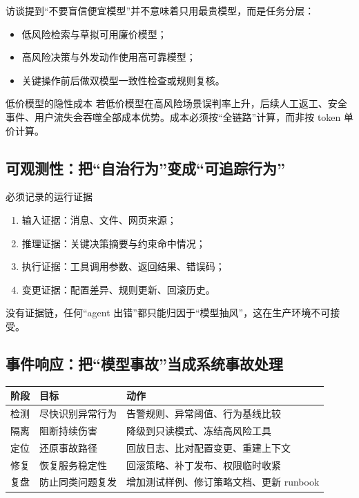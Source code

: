 \documentclass[a4paper]{article}
\begin{document}
访谈提到“不要盲信便宜模型”并不意味着只用最贵模型，而是任务分层：
\begin{itemize}
    \item 低风险检索与草拟可用廉价模型；
    \item 高风险决策与外发动作使用高可靠模型；
    \item 关键操作前后做双模型一致性检查或规则复核。
\end{itemize}

\begin{warningbox}{低价模型的隐性成本}
若低价模型在高风险场景误判率上升，后续人工返工、安全事件、用户流失会吞噬全部成本优势。成本必须按“全链路”计算，而非按 token 单价计算。
\end{warningbox}

\subsection{可观测性：把“自治行为”变成“可追踪行为”}

\begin{importantbox}{必须记录的运行证据}
\begin{enumerate}
    \item 输入证据：消息、文件、网页来源；
    \item 推理证据：关键决策摘要与约束命中情况；
    \item 执行证据：工具调用参数、返回结果、错误码；
    \item 变更证据：配置差异、规则更新、回滚历史。
\end{enumerate}
\end{importantbox}

没有证据链，任何“agent 出错”都只能归因于“模型抽风”，这在生产环境不可接受。

\subsection{事件响应：把“模型事故”当成系统事故处理}

\begin{longtable}{p{}p{}p{}}
\toprule
\textbf{阶段} & \textbf{目标} & \textbf{动作} \\
\midrule
检测 & 尽快识别异常行为 & 告警规则、异常阈值、行为基线比较 \\
\midrule
隔离 & 阻断持续伤害 & 降级到只读模式、冻结高风险工具 \\
\midrule
定位 & 还原事故路径 & 回放日志、比对配置变更、重建上下文 \\
\midrule
修复 & 恢复服务稳定性 & 回滚策略、补丁发布、权限临时收紧 \\
\midrule
复盘 & 防止同类问题复发 & 增加测试样例、修订策略文档、更新 runbook \\
\bottomrule
\end{longtable}
\end{document}
